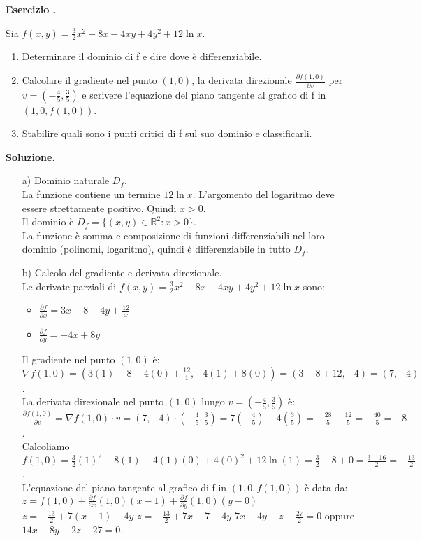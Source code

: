 \documentclass[12pt, a4paper]{article}
\newcounter{examcounter}
\newcounter{exercisecounter}[examcounter]
\newenvironment{exercise}{%
    \stepcounter{exercisecounter}%
    \par\noindent\textbf{Esercizio \theexercisecounter.}\medskip\par
    \normalfont
}{\par\bigskip}
\newenvironment{solution}{%
    \par\noindent\textbf{Soluzione.}\medskip\par
    \normalfont
}{\par\bigskip}
\begin{document}
\begin{exercise}
Sia $f(x,y) = \frac{3}{2}x^{2} - 8x - 4xy + 4y^{2} + 12 \ln x$.
\begin{enumerate}
    \item Determinare il dominio di f e dire dove è differenziabile.
    \item Calcolare il gradiente nel punto $(1,0)$, la derivata direzionale $\frac{\partial f(1,0)}{\partial v}$ per $v=(-\frac{4}{5},\frac{3}{5})$ e scrivere l'equazione del piano tangente al grafico di f in $(1,0,f(1,0))$.
    \item Stabilire quali sono i punti critici di f sul suo dominio e classificarli.
\end{enumerate}
\end{exercise}
\begin{solution}
\begin{enumerate}
    \item[a)] Dominio naturale \(D_f\).\\
    La funzione contiene un termine \(12 \ln x\). L'argomento del logaritmo deve essere strettamente positivo. Quindi \(x > 0\).\\
    Il dominio è \(D_f = \{ (x,y) \in \mathbb{R}^2 : x > 0 \}\).\\
    La funzione è somma e composizione di funzioni differenziabili nel loro dominio (polinomi, logaritmo), quindi è differenziabile in tutto \(D_f\).

    \item[b)] Calcolo del gradiente e derivata direzionale.\\
    Le derivate parziali di \(f(x,y) = \frac{3}{2}x^{2} - 8x - 4xy + 4y^{2} + 12 \ln x\) sono:
    \begin{itemize}
        \item \( \frac{\partial f}{\partial x} = 3x - 8 - 4y + \frac{12}{x} \)
        \item \( \frac{\partial f}{\partial y} = -4x + 8y \)
    \end{itemize}
    Il gradiente nel punto \((1,0)\) è:
    \( \nabla f(1,0) = \left( 3(1) - 8 - 4(0) + \frac{12}{1}, -4(1) + 8(0) \right) = (3 - 8 + 12, -4) = (7, -4) \).\\
    La derivata direzionale nel punto \((1,0)\) lungo \(v=(-\frac{4}{5},\frac{3}{5})\) è:
    \( \frac{\partial f(1,0)}{\partial v} = \nabla f(1,0) \cdot v = (7, -4) \cdot (-\frac{4}{5},\frac{3}{5}) = 7(-\frac{4}{5}) - 4(\frac{3}{5}) = -\frac{28}{5} - \frac{12}{5} = -\frac{40}{5} = -8 \).\\
    Calcoliamo \(f(1,0) = \frac{3}{2}(1)^2 - 8(1) - 4(1)(0) + 4(0)^2 + 12 \ln(1) = \frac{3}{2} - 8 + 0 = \frac{3-16}{2} = -\frac{13}{2}\).\\
    L'equazione del piano tangente al grafico di f in \((1,0,f(1,0))\) è data da:
    \( z = f(1,0) + \frac{\partial f}{\partial x}(1,0)(x-1) + \frac{\partial f}{\partial y}(1,0)(y-0) \)
    \( z = -\frac{13}{2} + 7(x-1) - 4y \)
    \( z = -\frac{13}{2} + 7x - 7 - 4y \)
    \( 7x - 4y - z - \frac{27}{2} = 0 \) oppure \( 14x - 8y - 2z - 27 = 0 \).


\end{enumerate}
\end{solution}
\end{document}
